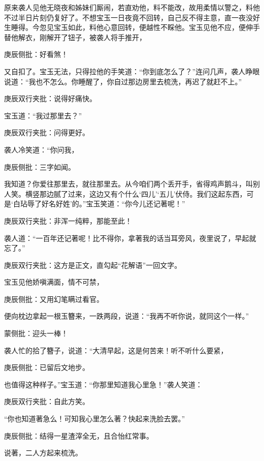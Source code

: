 \begin{parag}


    原来袭人见他无晓夜和姊妹们厮闹，若直劝他，料不能改，故用柔情以警之，料他不过半日片刻仍复好了。不想宝玉一日夜竟不回转，自己反不得主意，直一夜没好生睡得。今忽见宝玉如此，料他心意回转，便越性不睬他。宝玉见他不应，便伸手替他解衣，刚解开了钮子，被袭人将手推开，\begin{note}庚辰侧批：好看煞！\end{note}又自扣了。宝玉无法，只得拉他的手笑道：“你到底怎么了？”连问几声，袭人睁眼说道：“我也不怎么。你睡醒了，你自过那边房里去梳洗，再迟了就赶不上。”\begin{note}庚辰双行夹批：说得好痛快。\end{note}宝玉道：“我过那里去？”\begin{note}庚辰双行夹批：问得更好。\end{note}袭人冷笑道：“你问我，\begin{note}庚辰侧批：三字如闻。\end{note}我知道？你爱往那里去，就往那里去。从今咱们两个丢开手，省得鸡声鹅斗，叫别人笑。横竖那边腻了过来，这边又有个什么‘四儿’‘五儿’伏侍。我们这起东西，可是‘白玷辱了好名好姓’的。”宝玉笑道：“你今儿还记著呢！”\begin{note}庚辰双行夹批：非浑一纯粹，那能至此！\end{note}袭人道：“一百年还记著呢！比不得你，拿著我的话当耳旁风，夜里说了，早起就忘了。”\begin{note}庚辰双行夹批：这方是正文，直勾起“花解语”一回文字。\end{note}宝玉见他娇嗔满面，情不可禁，\begin{note}庚辰侧批：又用幻笔瞒过看官。\end{note}便向枕边拿起一根玉簪来，一跌两段，说道：“我再不听你说，就同这个一样。”\begin{note}蒙侧批：迎头一棒！\end{note}袭人忙的拾了簪子，说道：“大清早起，这是何苦来！听不听什么要紧，\begin{note}庚辰侧批：已留后文地步。\end{note}也值得这种样子。”宝玉道：“你那里知道我心里急！”袭人笑道：\begin{note}庚辰双行夹批：自此方笑。\end{note}“你也知道著急么！可知我心里怎么著？快起来洗脸去罢。”\begin{note}庚辰侧批：结得一星渣滓全无，且合怡红常事。\end{note}说著，二人方起来梳洗。
\end{parag}


